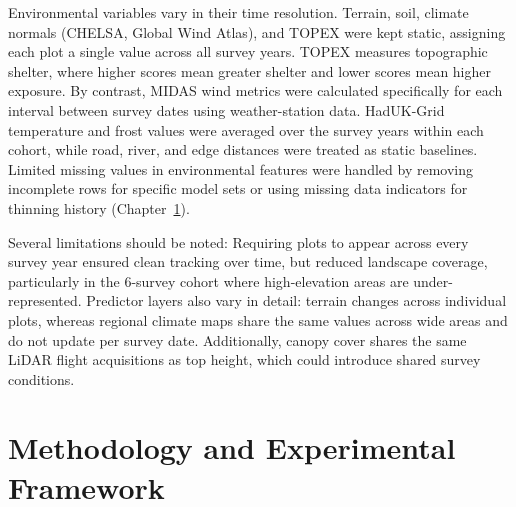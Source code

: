 \documentclass[logo,msc,ai]{infthesis}           %
\begin{document}
Environmental variables vary in their time resolution. Terrain, soil, climate normals (CHELSA, Global Wind Atlas), and TOPEX were kept static, assigning each plot a single value across all survey years. TOPEX measures topographic shelter, where higher scores mean greater shelter and lower scores mean higher exposure. By contrast, MIDAS wind metrics were calculated specifically for each interval between survey dates using weather-station data. HadUK-Grid temperature and frost values were averaged over the survey years within each cohort, while road, river, and edge distances were treated as static baselines. Limited missing values in environmental features were handled by removing incomplete rows for specific model sets or using missing data indicators for thinning history (Chapter~\ref{ch:methodology}).

Several limitations should be noted: Requiring plots to appear across every survey year ensured clean tracking over time, but reduced landscape coverage, particularly in the 6-survey cohort where high-elevation areas are under-represented. Predictor layers also vary in detail: terrain changes across individual plots, whereas regional climate maps share the same values across wide areas and do not update per survey date. Additionally, canopy cover shares the same LiDAR flight acquisitions as top height, which could introduce shared survey conditions.

\chapter{Methodology and Experimental Framework} \label{ch:methodology}
\end{document}
